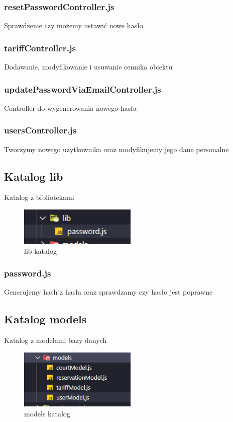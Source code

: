\documentclass[titlepage]{article}
\begin{document}
\subsubsection{resetPasswordController.js}
Sprawdzenie czy możemy ustawić nowe hasło

\subsubsection{tariffController.js}
Dodawanie, modyfikowanie i usuwanie cennika obiektu

\subsubsection{updatePasswordViaEmailController.js}
Controller do wygenerowania nowego hasła

\subsubsection{usersController.js}
Tworzymy nowego użytkownika oraz modyfikujemy jego dane personalne

\newpage
\subsection{Katalog lib}
Katalog z bibliotekami

\begin{figure}[h]
\centering
\includegraphics[width=0.5\textwidth]{lib.png}
\caption{lib katalog}
\label{fig:obrazek lib}
\end{figure}

\subsubsection{password.js}
Generujemy hash z hasła oraz sprawdzamy czy hasło jest poprawne 

\subsection{Katalog models}
Katalog z modelami bazy danych

\begin{figure}[h]
\centering
\includegraphics[width=0.5\textwidth]{models.png}
\caption{models katalog}
\label{fig:obrazek models}
\end{figure}
\end{document}
